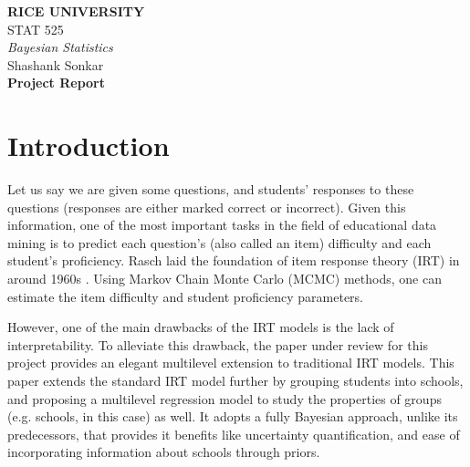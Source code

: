 \documentclass[12pt]{article}
\begin{document}
\begin{center}
{\bf RICE UNIVERSITY} \\
STAT 525 \\
{\it Bayesian Statistics} \\ 
\vspace{5pt}
Shashank Sonkar \\
\vspace{11pt}
{\bf Project Report}
\end{center}

\section{Introduction}
Let us say we are given some questions, and students' responses to these questions (responses are either marked correct or incorrect). Given this information, one of the most important tasks in the field of educational data mining is to predict each question's (also called an item) difficulty and each student's proficiency. Rasch laid the foundation of item response theory (IRT) in around 1960s \cite{rasch1960probabilistic,rasch1966item}. Using Markov Chain Monte Carlo (MCMC) methods, one can estimate the item difficulty and student proficiency parameters.

However, one of the main drawbacks of the IRT models is the lack of interpretability. To alleviate this drawback, the paper under review for this project \cite{fox2001bayesian} provides an elegant multilevel extension to traditional IRT models. This paper extends the standard IRT model further by grouping students into schools, and proposing a multilevel regression model to study the properties of groups (e.g. schools, in this case) as well. It adopts a fully Bayesian approach, unlike its predecessors, that provides it benefits like uncertainty quantification, and ease of incorporating information about schools through priors.

\end{document}
